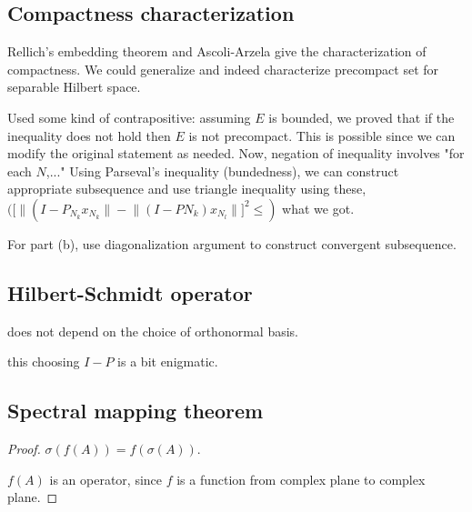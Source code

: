 \documentclass{article}
\theoremstyle{remark}
\begin{document}
\begin{itemize}
\subsection*{Compactness characterization}
\item Rellich's embedding theorem and Ascoli-Arzela give the characterization of compactness. We could generalize and indeed characterize precompact set for separable Hilbert space.
\item Used some kind of contrapositive: assuming $E$ is bounded, we proved that if the inequality does not hold then $E$ is not precompact. This is possible since we can modify the original statement as needed. Now, negation of inequality involves "for each $N$,..." Using Parseval's inequality (bundedness), we can construct appropriate subsequence and use triangle inequality using these, $([\lVert(I-P_{N_k}x_{N_k}\rVert-\lVert(I-P{N_k})x_{N_l}\rVert]^2\leq)$ what we got.
\item For part (b), use diagonalization argument to construct convergent subsequence.

\subsection*{Hilbert-Schmidt operator}
\item does not depend on the choice of orthonormal basis.
\item this choosing $I-P$ is a bit enigmatic.









\subsection*{Spectral mapping theorem}
\begin{proof}
\item $\sigma(f(A))=f(\sigma(A))$.
\item $f(A)$ is an operator, since $f$ is a function from complex plane to complex plane.
\end{proof}


\end{itemize}
\end{document}
